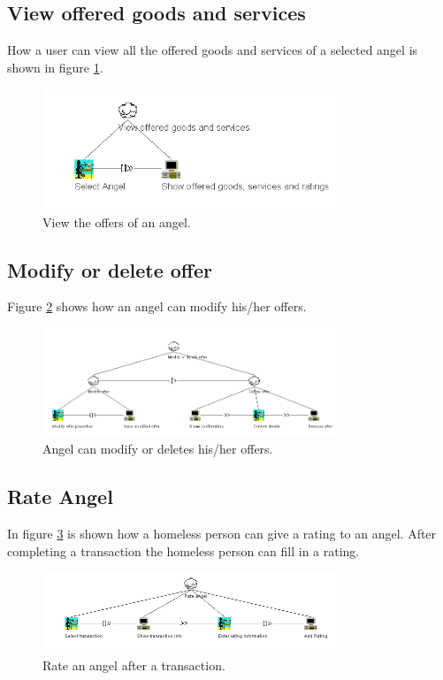 \documentclass[a4paper]{report}
\begin{document}
\subsection{View offered goods and services}
How a user can view all the offered goods and services of a selected angel is shown in figure \ref{fig:CTTGoods}.
\begin{figure}[h]
    \centering
    \includegraphics[width=0.8\textwidth]{CTT/CTTpng/CTTGoods.png}
    \caption{View the offers of an angel.}
    \label{fig:CTTGoods}
\end{figure}

\subsection{Modify or delete offer}
Figure \ref{fig:CTTModifyOffer} shows how an angel can modify his/her offers. 
\begin{figure}[h]
    \centering
    \includegraphics[width=0.8\textwidth]{CTT/CTTpng/CTTModifyOffer.png}
    \caption{Angel can modify or deletes his/her offers.}
    \label{fig:CTTModifyOffer}
\end{figure}

\subsection{Rate Angel}
In figure \ref{fig:CTTRating} is shown how a homeless person can give a rating to an angel. After completing a transaction the homeless person can fill in a rating.
\begin{figure}[h]
    \centering
    \includegraphics[width=0.8\textwidth]{CTT/CTTpng/CTTRating.png}
    \caption{Rate an angel after a transaction.}
    \label{fig:CTTRating}
\end{figure}
\end{document}
